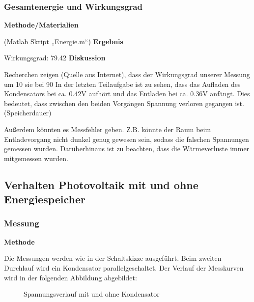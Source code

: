 \documentclass{etit-workshop-protokoll}
\begin{document}
    \subsubsection{Gesamtenergie und Wirkungsgrad}                      %
        \textbf{Methode/Materialien}
        \newline
        \par
        (Matlab Skript „Energie.m“)
        \vspace{4mm}
        \newline
        \textbf{Ergebnis}
        \newline
        \par Wirkungsgrad: 79.42%
        \vspace{4mm}
        \newline
        \textbf{Diskussion}
        \newline
        \par Recherchen zeigen (Quelle aus Internet), dass der Wirkungsgrad unserer Messung um 10 %
        sie bei 90%
        In der letzten Teilaufgabe ist zu sehen, dass das Aufladen des Kondensators bei ca. 0.42V aufhört und
        das Entladen bei ca. 0.36V anfängt. Dies bedeutet, dass zwischen den beiden Vorgängen Spannung
        verloren gegangen ist. (Speicherdauer)
        \par Außerdem könnten es Messfehler geben. Z.B. könnte der Raum beim Entladevorgang nicht dunkel
        genug gewesen sein, sodass die falschen Spannungen gemessen wurden. Darüberhinaus ist zu beachten,
        dass die Wärmeverluste immer mitgemessen wurden.
\subsection {Verhalten Photovoltaik mit und ohne Energiespeicher}   %
    \subsubsection{Messung}                                             %
        \textbf{Methode}
        \newline
        \par Die Messungen werden wie in der Schaltskizze ausgeführt. Beim zweiten Durchlauf wird ein Kondensator parallelgeschaltet. Der Verlauf der Messkurven wird in der folgenden Abbildung abgebildet:
        
        \begin{figure}[H]
            \def\svgwidth{\textwidth}
               
            \caption{Spannungsverlauf mit und ohne Kondensator}
    \end{figure}
        
\end{document}
